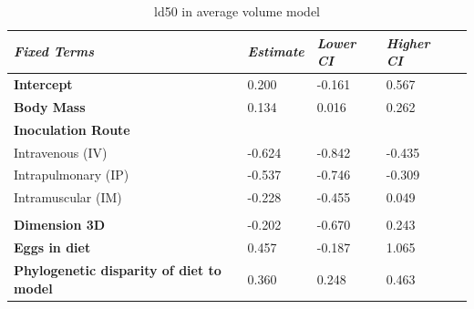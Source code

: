 \begin{table}[h!]
  \centering
    \caption[Table 3.]{ld50 in average volume model}
\begin{tabular}{*5l}    \toprule
\emph{Fixed Terms} & \emph{Estimate} & \emph{Lower CI} & \emph{Higher CI}\\\midrule
\textbf{Intercept} & 0.200  & -0.161 & 0.567 \\ 
\textbf{Body Mass} & 0.134  & 0.016 & 0.262 \\ 
\textbf{Inoculation Route} &  &  &  \\ 
 Intravenous (IV) & -0.624 & -0.842 & -0.435 \\
 Intrapulmonary (IP) & -0.537 & -0.746 & -0.309 \\ 
 Intramuscular (IM) & -0.228 & -0.455 & 0.049 \\
  &  &  &  \\ 
\textbf{Dimension 3D} & -0.202 & -0.670 & 0.243 \\ 
\textbf{Eggs in diet} & 0.457 & -0.187 & 1.065 \\ 
\textbf{Phylogenetic disparity of diet to model} & 0.360 & 0.248 & 0.463 \\\bottomrule
 \hline
\end{tabular}
  \label{tbl:Table 3.}
\end{table}







